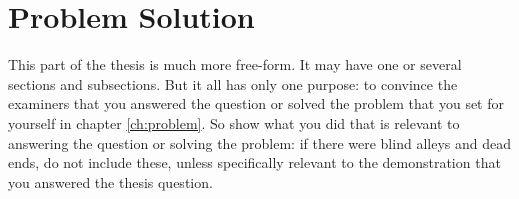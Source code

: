 \chapter{Problem Solution}
\label{ch:solution}

This part of the thesis is much more free-form. It may have one or several
sections and subsections. But it all has only one purpose: to convince the
examiners that you answered the question or solved the problem that you set for
yourself in chapter \ref{ch:problem}. So show what you did that is relevant to
answering the question or solving the problem: if there were blind alleys and
dead ends, do not include these, unless specifically relevant to the
demonstration that you answered the thesis question.